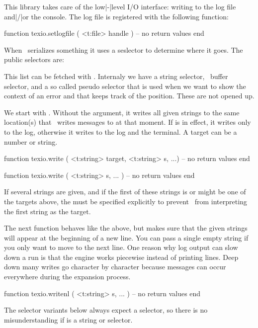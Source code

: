 \stopsection

\startsection[title={Input and output}]

This library takes care of the low|-|level I/O interface: writing to the log file
and|/|or the console. The log file is registered with the following function:

\starttyping[option=LUA]
function texio.setlogfile ( <t:file> handle )
    -- no return values
end
\stoptyping

When \TEX\ serializes something it uses a seslector to determine where it goes.
The public selectors are:


This list can be fetched with . Internaly we
have a string selector, \LUA\ buffer selector, and a so called pseudo selector
that is used when we want to show the context of an error and that keeps track of
the position. These are not opened up.

We start with . Without the  argument, it writes
all given strings to the same location(s) that \TEX\ writes messages to at that
moment. If \type {\batchmode} is in effect, it writes only to the log, otherwise
it writes to the log and the terminal. A target can be a number or string.

\starttyping[option=LUA]
function texio.write ( <t:string> target, <t:string> s, ...)
    -- no return values
end

function texio.write ( <t:string> s, ... )
    -- no return values
end
\stoptyping

If several strings are given, and if the first of these strings is or might be
one of the targets above, the  must be specified explicitly to
prevent \LUA\ from interpreting the first string as the target.

The next function behaves like the above, but makes sure that the given strings
will appear at the beginning of a new line. You can pass a single empty string if
you only want to move to the next line. One reason why log output can slow down a
run is that the engine works piecewise instead of printing lines. Deep down many
writes go character by character because messages can occur everywhere during the
expansion process.

\starttyping[option=LUA]
function texio.writenl ( <t:string> s, ... )
    -- no return values
end
\stoptyping

The selector variants below always expect a selector, so there is no
misunderstanding if  is a string or selector.

